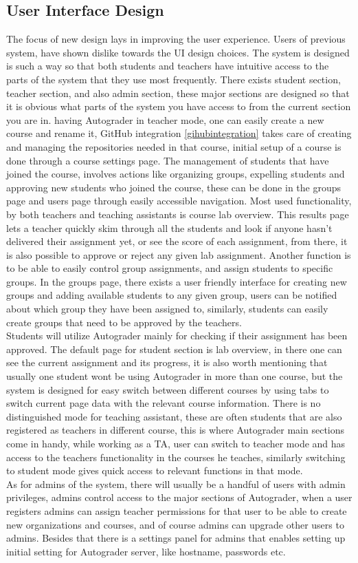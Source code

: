 \subsection{User Interface Design}
The focus of new design lays in improving the user experience. Users of previous system, have shown dislike towards the UI design choices. The system is designed is such a way so that both students and teachers have intuitive access to the parts of the system that they use most frequently. There exists student section, teacher section, and also admin section, these major sections are designed so that it is obvious what parts of the system you have access to from the current section you are in. having Autograder in teacher mode, one can easily create a new course and rename it, GitHub integration \ref{gihubintegration} takes care of creating and managing the repositories needed in that course, initial setup of a course is done through a course settings page. The management of students that have joined the course, involves actions like organizing groups, expelling students and approving new students who joined the course, these can be done in the groups page and users page through easily accessible navigation. Most used functionality, by both teachers and teaching assistants is course lab overview. This results page lets a teacher quickly skim through all the students and look if anyone hasn't delivered their assignment yet, or see the score of each assignment, from there, it is also possible to approve or reject any given lab assignment. Another function is to be able to easily control group assignments, and assign students to specific groups. In the groups page, there exists a user friendly interface for creating new groups and adding available students to any given group, users can be notified about which group they have been assigned to, similarly, students can easily create groups that need to be approved by the teachers.
\\Students will utilize Autograder mainly for checking if their assignment has been approved. The default page for student section is lab overview, in there one can see the current assignment and its progress, it is also worth mentioning that usually one student wont be using Autograder in more than one course, but the system is designed for easy switch between different courses by using tabs to switch current page data with the relevant course information. There is no distinguished mode for teaching assistant, these are often students that are also registered as teachers in different course, this is where Autograder main sections come in handy, while working as a TA, user can switch to teacher mode and has access to the teachers functionality in the courses he teaches, similarly switching to student mode gives quick access to relevant functions in that mode.
\\As for admins of the system, there will usually be a handful of users with admin privileges, admins control access to the major sections of Autograder, when a user registers admins can assign teacher permissions for that user to be able to create new organizations and courses, and of course admins can upgrade other users to admins. Besides that there is a settings panel for admins that enables setting up initial setting for Autograder server, like hostname, passwords etc.
